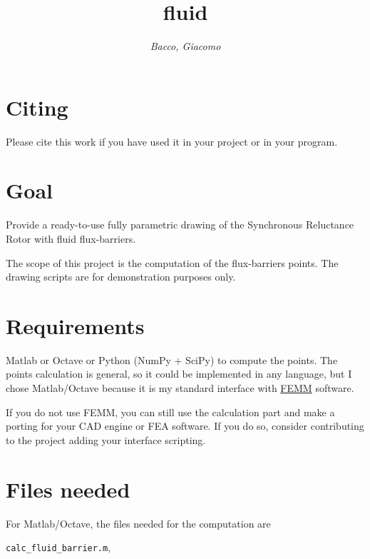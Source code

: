 \documentclass[b5paper,11pt,oneside,fleqn]{article}
\title{\raggedleft\sffamily\Huge fluid}
\author{\sffamily\itshape Bacco, Giacomo}
\date{}
\begin{document}
\maketitle


\section*{Citing}
Please cite this work if you have used it in your project or in your program.
\vspace{0\baselineskip}

{\noindent%
}


\tableofcontents



\section*{Goal}
Provide a ready-to-use fully parametric drawing of the Synchronous Reluctance 
Rotor with fluid flux-barriers.

The scope of this project is the computation of the flux-barriers points.
The drawing scripts are for demonstration purposes only.


\section*{Requirements}
Matlab or Octave or Python (NumPy + SciPy) to compute the points.
The points calculation is general, so it could be implemented in any language, 
but I chose Matlab/Octave because it is my standard interface with 
\href{http://www.femm.info/}{FEMM} software.

If you do not use FEMM, you can still use the calculation part and make a 
porting for your CAD engine or FEA software. If you do so, consider 
contributing to the project adding your interface scripting.


\section{Files needed}

For Matlab/Octave, the files needed for the computation are


\texttt{calc\_fluid\_barrier.m},
\end{document}
